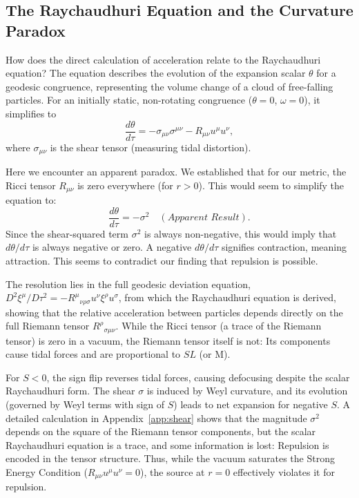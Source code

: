 \documentclass[%
  reprint,
  superscriptaddress,
  showpacs,
  showkeys,
  amsmath,amssymb,
  pra,
  longbibliography,
  floatfix,
  x11names
]{revtex4-2}
\begin{document}
\subsection{The Raychaudhuri Equation and the Curvature Paradox}

How does the direct calculation of acceleration relate to the Raychaudhuri equation? The equation describes the evolution of the expansion scalar $\theta$ for a geodesic congruence, representing the volume change of a cloud of free-falling particles. For an initially static, non-rotating congruence ($\theta=0$, $\omega=0$), it simplifies to
\begin{equation}
\frac{d\theta}{d\tau} = - \sigma_{\mu\nu}\sigma^{\mu\nu} - R_{\mu\nu}u^\mu u^\nu,
\label{eq:raychaudhuri}
\end{equation}
where $\sigma_{\mu\nu}$ is the shear tensor (measuring tidal distortion).

Here we encounter an apparent paradox. We established that for our metric, the Ricci tensor $R_{\mu\nu}$ is zero everywhere (for $r>0$). This would seem to simplify the equation to:
\begin{equation}
\frac{d\theta}{d\tau} = - \sigma^2 \quad (\textit{Apparent Result}).
\end{equation}
Since the shear-squared term $\sigma^2$ is always non-negative, this would imply that $d\theta/d\tau$ is always negative or zero. A negative $d\theta/d\tau$ signifies contraction, meaning attraction. This seems to contradict our finding that repulsion is possible.

The resolution lies in the full geodesic deviation equation, $D^2 \xi^\mu / D\tau^2 = - R^\mu{}_{\nu\rho\sigma} u^\nu \xi^\rho u^\sigma$, from which the Raychaudhuri equation is derived, showing that the relative acceleration between particles depends directly on the full Riemann tensor $R^\rho{}_{\sigma\mu\nu}$. While the Ricci tensor (a trace of the Riemann tensor) is zero in a vacuum, the Riemann tensor itself is not: Its components cause tidal forces and are proportional to $S L$ (or M).

For $S<0$, the sign flip reverses tidal forces, causing defocusing despite the scalar Raychaudhuri form. The shear $\sigma$ is induced by Weyl curvature, and its evolution (governed by Weyl terms with sign of $S$) leads to net expansion for negative $S$. A detailed calculation in Appendix~\ref{app:shear} shows that the magnitude $\sigma^2$ depends on the square of the Riemann tensor components, but the scalar Raychaudhuri equation is a trace, and some information is lost: Repulsion is encoded in the tensor structure. Thus, while the vacuum saturates the Strong Energy Condition ($R_{\mu\nu} u^\mu u^\nu =0$), the source at $r=0$ effectively violates it for repulsion.
\end{document}
